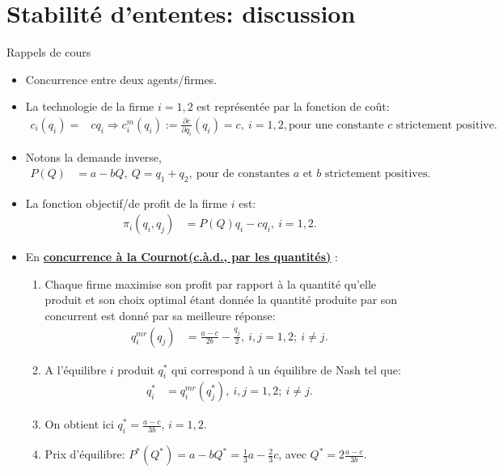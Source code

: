 \section{Stabilité d'ententes: discussion}
\frame {\sectionpage}
\begin{frame}[allowframebreaks]{Rappels de cours}
\begin{itemize}
    \item Concurrence entre deux agents/firmes.
    \item La technologie de la firme $i = 1, 2$ est représentée par la fonction de coût:
    \begin{align*}
        c_i(q_i) =& c q_i \Rightarrow  c^m_i(q_i) :=\frac{\partial c}{\partial q_i}(q_i) = c,  \ i = 1, 2, \text{pour une constante $c$ strictement positive}.\  
    \end{align*}
    \item Notons la demande inverse,
    \begin{align*}
        P(Q) &= a - b Q, \ Q = q_1+q_2, \ \text{pour de constantes $a$ et $b$ strictement positives}.
    \end{align*}
    \item La fonction objectif/de profit de la firme $i$ est:
    \begin{align*}
        \pi_i(q_i, q_j) &=P(Q)q_i - c q_i, \ i=1, 2.
    \end{align*}
    \framebreak 
    \item En \textbf{\underline{concurrence à la Cournot(c.à.d., par les quantités)}} :
    \begin{enumerate}[-]
        \item Chaque firme maximise son profit par rapport à la quantité qu'elle produit et son choix optimal étant donnée 
        la quantité produite par son concurrent est donné par sa meilleure réponse:
        \begin{align*}
            q_i^{mr}(q_j) &=\frac{a-c}{2b} - \frac{q_j}{2}, \ i, j = 1, 2; \ i\neq j.
        \end{align*}
        \item A l'équilibre $i$ produit $q_i^*$ qui correspond à un équilibre  de Nash tel que:
        \begin{align*}
            q_i^* &=q_i^{mr}(q_j^*), \  i, j = 1, 2; \ i\neq j.
        \end{align*}
        \item On obtient ici $q_i^* = \frac{a-c}{3b}$, $i = 1, 2$.
        \item Prix d'équilibre: $P^*(Q^*) = a - b Q^* = \frac{1}{3}a - \frac{2}{3}c$, avec $Q^* = 2 \frac{a-c}{3b}$.

\end{enumerate}
\end{itemize}
\end{frame}
